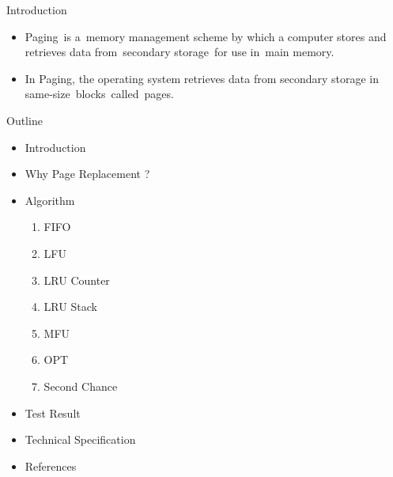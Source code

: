 \documentclass{beamer}
\begin{document}
\begin{frame}{Introduction}
	\begin{itemize}
		\item Paging is a memory management scheme by which a computer stores and retrieves data from secondary storage for use in main memory.
		\item In Paging, the operating system retrieves data from secondary storage in same-size blocks called pages.
		 
	\end{itemize}
\end{frame}
\begin{frame}{Outline}
	\begin{itemize}
		\item Introduction
		\item \alert{Why Page Replacement ?}
		\item Algorithm
		
		\begin{enumerate}
			\item FIFO
			\item LFU
			\item LRU Counter
			\item LRU Stack
			\item MFU
			\item OPT
			\item Second Chance
		\end{enumerate}
		\item Test Result
		\item Technical Specification
		\item References
		
		
	\end{itemize}
\end{frame}
\end{document}
